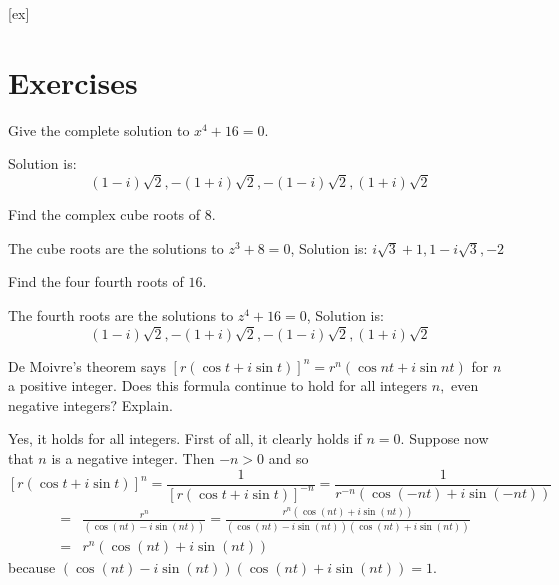 [ex]
\section*{Exercises}

\begin{enumialphparenastyle}

\begin{ex} Give the complete solution to $x^{4}+16=0.$ 
\begin{sol}
 Solution is:
\[
\left( 1-i\right) \sqrt{2},-\left( 1+i\right) \sqrt{2},-\left( 1-i\right)
\sqrt{2},\left( 1+i\right) \sqrt{2}
\]
\end{sol}
\end{ex}

\begin{ex} \label{cuberoots} Find the complex cube roots of $8$.
\begin{sol}
The cube roots are the solutions to $%
z^{3}+8=0$, Solution is: $i\sqrt{3} +1,1-i\sqrt{3},-2$
\end{sol}
\end{ex}

\begin{ex} \label{cuberoots2} Find the four fourth roots of $16$.  
\begin{sol}
The fourth roots are
the solutions to $z^{4}+16=0$, Solution is:
\[
\left( 1-i\right) \sqrt{2},-\left( 1+i\right) \sqrt{2},-\left( 1-i\right)
\sqrt{2},\left( 1+i\right)\sqrt{2}
\]
\end{sol}
\end{ex}

\begin{ex} \label{exercomplex1}De Moivre's theorem says $\left[ r\left( \cos
t+i\sin t\right) \right] ^{n}=r^{n}\left( \cos nt+i\sin nt\right) $ for $n$
a positive integer. Does this formula continue to hold for all integers $n,$
even negative integers$?$ Explain.  
\begin{sol}
Yes, it holds for all integers. First of
all, it clearly holds if $n=0$. Suppose now that $n$ is a negative integer.
Then $-n>0$ and so
\[
\left[ r\left( \cos t+i\sin t\right) \right] ^{n}=\frac{1}{\left[ r\left(
\cos t+i\sin t\right) \right] ^{-n}}=\frac{1}{r^{-n}\left( \cos \left(
-nt\right) +i\sin \left( -nt\right) \right) }
\]
\begin{eqnarray*}
&=&\frac{r^{n}}{\left( \cos \left( nt\right) -i\sin \left( nt\right) \right)
}=\frac{r^{n}\left( \cos \left( nt\right) +i\sin \left( nt\right) \right) }{
\left( \cos \left( nt\right) -i\sin \left( nt\right) \right) \left( \cos
\left( nt\right) +i\sin \left( nt\right) \right) } \\
&=&r^{n}\left( \cos \left( nt\right) +i\sin \left( nt\right) \right)
\end{eqnarray*}
because $\left( \cos \left( nt\right) -i\sin \left( nt\right) \right) \left(
\cos \left( nt\right) +i\sin \left( nt\right) \right) =1.$
\end{sol}
\end{ex}


\end{enumialphparenastyle}
